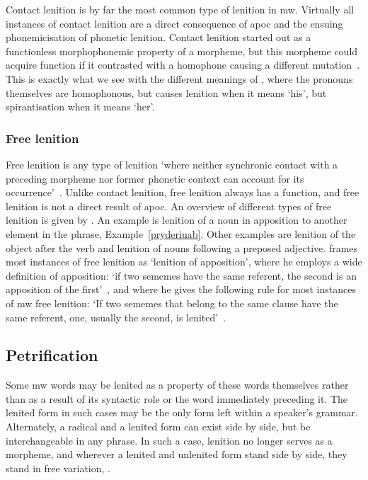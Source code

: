 Contact lenition is by far the most common type of lenition in \gls{mw}. Virtually all instances of contact lenition are a direct consequence of \gls{apoc} and the ensuing phonemicisation of phonetic lenition. Contact lenition started out as a functionless morphophonemic property of a morpheme,  but this morpheme could acquire function if it contrasted with a homophone causing a different mutation~\autocite[1]{schrijver_free_2010}. This is exactly what we see with the different meanings of , where the pronouns themselves are homophonous, but  causes lenition when it means `his', but spirantisation when it means `her'.

\subsubsection{Free lenition}
\label{sec:free-lenition}
Free lenition is any type of lenition `where neither synchronic contact with a preceding morpheme nor former phonetic context can account for its occurrence'~\autocite[1]{schrijver_free_2010}. Unlike contact lenition, free lenition always has a function, and free lenition is not a direct result of \gls{apoc}. 
An overview of different types of free lenition is given by \textcite{schrijver_free_2010}. An example is lenition of a noun in apposition to another element in the phrase, \eg Example~\ref{pryderiuab}.
Other examples are lenition of the object after the verb and lenition of nouns following a preposed adjective.
\Textcite{schrijver_free_2010} frames most instances of free lenition  as `lenition of apposition', where he employs a wide definition of apposition: `if two sememes have the same referent, the second is an apposition of the first'~\autocite[3]{schrijver_free_2010}, and where he gives the following rule for most instances of \gls{mw} free lenition: `If two sememes that belong to the same clause have the same referent, one, usually the second, is lenited'~\autocite[3]{schrijver_free_2010}.

\subsection{Petrification}
\label{sec:petrification}
Some \gls{mw} words may be lenited as a property of these words themselves rather than as a result of its syntactic role or the word immediately preceding it.
The lenited form in such cases may be the only form left within a speaker's grammar.
Alternately, a radical and a lenited form can exist side by side, but be interchangeable in any phrase. In such a case, lenition no longer serves as a morpheme, and wherever a lenited and unlenited form stand side by side, they stand in free variation, \eg {}.

